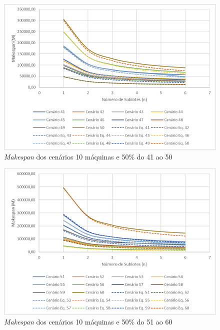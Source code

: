 \begin{figure}[H]
    \centering
     \includegraphics[width=13cm]{Apendices/Figuras/10m50_41-50.png}
     \caption{\textit{Makespan} dos cenários 10 máquinas e 50\% do 41 ao 50}
    \label{fig:10m50_41-50}
\end{figure}

\begin{figure}[H]
    \centering
     \includegraphics[width=13cm]{Apendices/Figuras/10m50_51-60.png}
     \caption{\textit{Makespan} dos cenários 10 máquinas e 50\% do 51 ao 60}
    \label{fig:10m50_51-60}
\end{figure}


